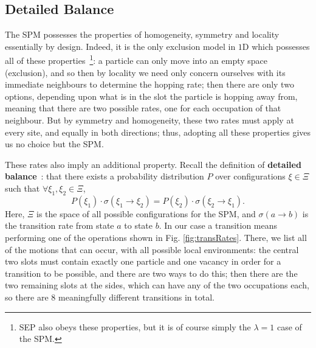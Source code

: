 \subsection{Detailed Balance} \label{sec:dbProof}
The SPM possesses the properties of homogeneity, symmetry and locality essentially by design. Indeed, it is
the only exclusion model in $1$D which possesses all of these
properties~\footnote{SEP also obeys these properties, but it is of course 
simply the $\lambda=1$ case of the SPM.}: a particle can only move into
an empty space (exclusion), and so then by locality we need only concern ourselves with its immediate 
neighbours to determine the hopping rate; then there are only two options, depending upon what is in the 
slot the particle is hopping away from, meaning that there are two possible rates, one for each occupation
of that neighbour. But by symmetry and homogeneity, these two rates must apply at every site, and equally
in both directions; thus, adopting all these properties gives us no choice but the SPM.

These rates also imply an additional property. Recall the definition of 
\textbf{detailed balance}~\cite{gardiner1985}:
that there exists
a probability distribution $P$ over configurations $\xi \in \Xi$ such that 
$\forall \xi_1 , \xi_2 \in \Xi $,
  \begin{equation} \label{eq:dbDefn}
    P(\xi_1) \cdot \sigma(\xi_1 \rightarrow \xi_2) = P(\xi_2) \cdot \sigma(\xi_2 \rightarrow \xi_1).
  \end{equation}  
Here, $\Xi$ is the space of all possible configurations for the SPM, and 
$\sigma(a \rightarrow b)$ is the transition rate from state $a$ to state $b$. In our case a transition
means performing one of the operations shown in Fig. \ref{fig:transRates}. There,
we
list all of the motions that can occur, with all possible local environments: the central two slots must
contain exactly one particle and one vacancy in order for a transition to be possible, and there are two
ways to do this; then there are the two remaining slots at the sides, which can have any of the two
occupations each, so there are $8$ meaningfully different transitions in total.

